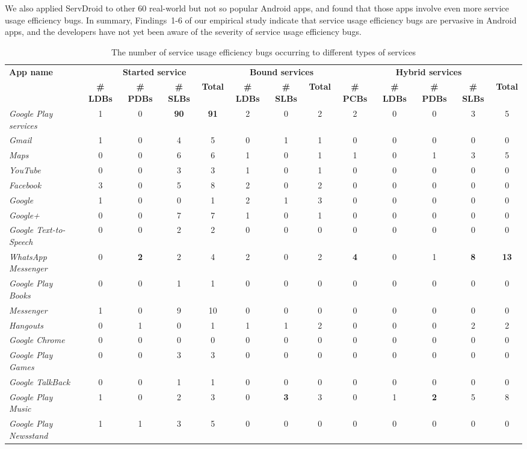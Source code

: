\documentclass[sigconf,review, anonymous]{acmart}
\begin{document}
We also applied \textsf{ServDroid} to other 60 real-world but not so popular Android apps, and found that those apps involve even more service usage efficiency bugs. In summary, Findings~1-6 of our empirical study indicate that service usage efficiency bugs are pervasive in Android apps, and the developers have not yet been aware of the severity of service usage efficiency bugs. 

\begin{table} [htbp]
\centering
\small
\caption{The number of service usage efficiency bugs occurring to different types of services}
\begin{tabular}{|l|cccc|ccc|ccccc|}\hline
{\bf App name}&\multicolumn{4}{|c|}{\textbf{Started service}}&\multicolumn{3}{|c|}{\textbf{Bound services}}&\multicolumn{5}{|c|}{\textbf{Hybrid services}}\\
& {\bf \# LDBs}&{\bf \# PDBs} &{\bf \# SLBs}&{\bf Total}
& {\bf \# LDBs}& {\bf \# SLBs}&{\bf Total}
& {\bf \# PCBs}&{\bf \# LDBs}&{\bf \# PDBs} &{\bf \# SLBs}&{\bf Total}\\
\hline
\hline
{\it Google Play services}&1&0&{\bf 90}&{\bf 91}&2&0&2&2&0&0&3&5\\
{\it Gmail}&1&0&4&5&0&1&1&0&0&0&0&0\\
{\it Maps}&0&0&6&6&1&0&1&1&0&1&3&5\\
{\it YouTube}&0&0&3&3&1&0&1&0&0&0&0&0\\
{\it Facebook}&3&0&5&8&2&0&2&0&0&0&0&0\\
{\it Google}&1&0&0&1&2&1&3&0&0&0&0&0\\
{\it Google+}&0&0&7&7&1&0&1&0&0&0&0&0\\
{\it Google Text-to-Speech}&0&0&2&2&0&0&0&0&0&0&0&0\\
{\it WhatsApp Messenger}&0&{\bf 2}&2&4&2&0&2&{\bf 4}&0&1&{\bf 8}&{\bf 13}\\
{\it Google Play Books}&0&0&1&1&0&0&0&0&0&0&0&0\\
{\it Messenger}&1&0&9&10&0&0&0&0&0&0&0&0\\
{\it Hangouts}&0&1&0&1&1&1&2&0&0&0&2&2\\
{\it Google Chrome}&0&0&0&0&0&0&0&0&0&0&0&0\\
{\it Google Play Games}&0&0&3&3&0&0&0&0&0&0&0&0\\
{\it Google TalkBack}&0&0&1&1&0&0&0&0&0&0&0&0\\
{\it Google Play Music}&1&0&2&3&0&{\bf 3}&3&0&1&{\bf 2}&5&8\\
{\it Google Play Newsstand}&1&1&3&5&0&0&0&0&0&0&0&0\\

\end{tabular}
\end{table}
\end{document}

